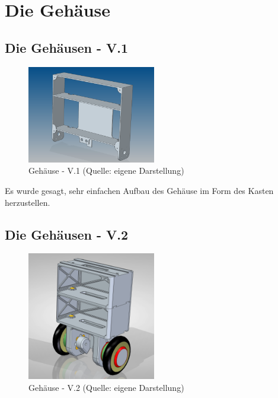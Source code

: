 \renewcommand{\autoren}{Valentyn Chepil}
\newpage
\section{Die Gehäuse}
\subsection{Die Gehäusen - V.1}

\begin{figure}[!h]  %
	\centering\includegraphics[width=0.5\textwidth]{images/gehaeuse-v1.png}
	\caption{Gehäuse - V.1 \newline (Quelle: eigene Darstellung)}
	\label{gehaeuse-v1} %
\end{figure}

Es wurde gesagt, sehr einfachen Aufbau des Gehäuse im Form des Kasten herzustellen.


\subsection{Die Gehäusen - V.2}


\begin{figure}[!h]  %
	\centering\includegraphics[width=0.5\textwidth]{images/gehaeuse-v2.png}
	\caption{Gehäuse - V.2 \newline (Quelle: eigene Darstellung)}
	\label{gehaeuse-v2} %
\end{figure}


